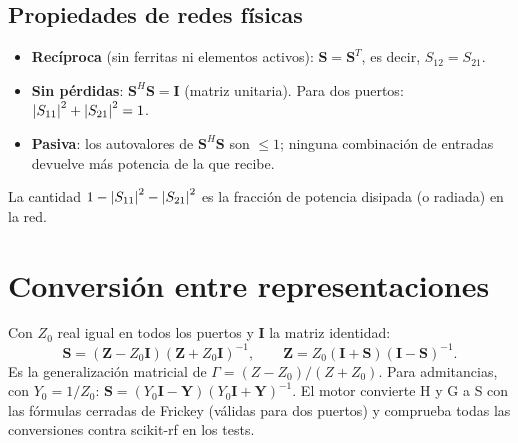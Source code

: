 \subsection{Propiedades de redes físicas}
\begin{itemize}
\item \textbf{Recíproca} (sin ferritas ni elementos activos): $\mathbf S = \mathbf S^T$, es decir, $S_{12} = S_{21}$.
\item \textbf{Sin pérdidas}: $\mathbf S^H\mathbf S = \mathbf I$ (matriz unitaria). Para dos puertos: $\left|S_{11}\right|^2 + \left|S_{21}\right|^2 = 1$.
\item \textbf{Pasiva}: los autovalores de $\mathbf S^H\mathbf S$ son $\le 1$; ninguna combinación de entradas devuelve más potencia de la que recibe.
\end{itemize}
La cantidad $1 - \left|S_{11}\right|^2 - \left|S_{21}\right|^2$ es la fracción de potencia disipada (o radiada) en la red.

\section{Conversión entre representaciones}
Con $Z_0$ real igual en todos los puertos y $\mathbf I$ la matriz identidad:
\begin{equation}
  \mathbf S = (\mathbf Z - Z_0\mathbf I)(\mathbf Z + Z_0\mathbf I)^{-1}, \qquad \mathbf Z = Z_0(\mathbf I + \mathbf S)(\mathbf I - \mathbf S)^{-1}.
\end{equation}
Es la generalización matricial de $\Gamma = (Z - Z_0)/(Z + Z_0)$. Para admitancias, con $Y_0 = 1/Z_0$:
$\mathbf S = (Y_0\mathbf I - \mathbf Y)(Y_0\mathbf I + \mathbf Y)^{-1}$. El motor convierte H y G a S con las fórmulas cerradas de Frickey
(válidas para dos puertos) y comprueba todas las conversiones contra scikit-rf en los tests.

